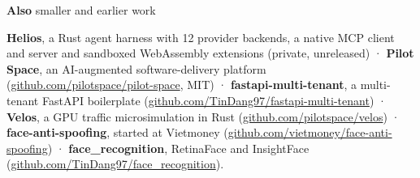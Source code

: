 \documentclass[10pt,a4paper,ragged2e,withhyper]{altacv}
\newcommand{\work}[3]{\par\vspace{7pt}\noindent\textbf{\textcolor{accent}{#1}} \textcolor{accent}{\textbullet} {\footnotesize #2}\par\nobreak\vspace{1pt}\noindent #3\par}
\begin{document}
\work{Also}{smaller and earlier work}{\textbf{Helios}, a Rust agent harness with 12 provider backends, a native MCP client and server and sandboxed WebAssembly extensions (private, unreleased) · \textbf{Pilot Space}, an AI-augmented software-delivery platform (\href{https://github.com/pilotspace/pilot-space}{github.com/\allowbreak pilotspace/\allowbreak pilot-space}, MIT) · \textbf{fastapi-multi-tenant}, a multi-tenant FastAPI boilerplate (\href{https://github.com/TinDang97/fastapi-multi-tenant}{github.com/\allowbreak TinDang97/\allowbreak fastapi-multi-tenant}) · \textbf{Velos}, a GPU traffic microsimulation in Rust (\href{https://github.com/pilotspace/velos}{github.com/\allowbreak pilotspace/\allowbreak velos}) · \textbf{face-anti-spoofing}, started at Vietmoney (\href{https://github.com/vietmoney/face-anti-spoofing}{github.com/\allowbreak vietmoney/\allowbreak face-anti-spoofing}) · \textbf{face\_recognition}, RetinaFace and InsightFace (\href{https://github.com/TinDang97/face_recognition}{github.com/\allowbreak TinDang97/\allowbreak face\_recognition}).}
\end{document}
